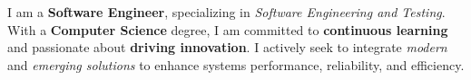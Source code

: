 \par{
  I am a \textbf{Software Engineer}, specializing in \textit{Software Engineering and Testing}. With a \textbf{Computer Science} degree, I am committed to \textbf{continuous learning} and passionate about \textbf{driving innovation}. I actively seek to integrate \textit{modern} and \textit{emerging solutions} to enhance systems performance, reliability, and efficiency.
}
